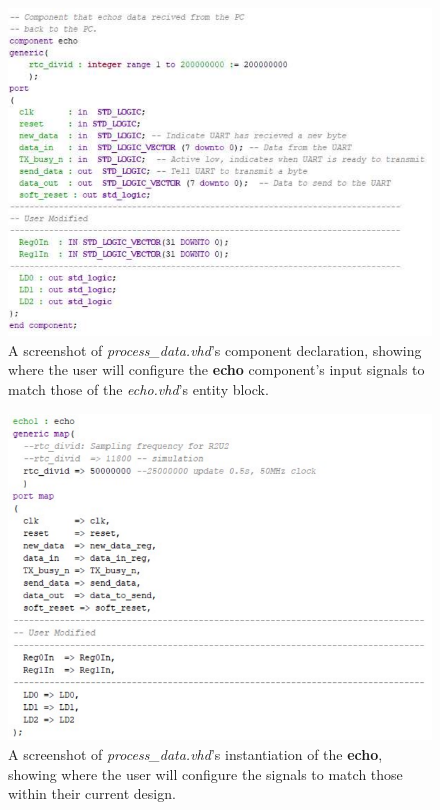 \begin{figure}[H]
	\begin{center}
	\includegraphics[scale=0.5]{fig/r2u2_hw_process_component.pdf}
	\caption{A screenshot of \textit{process\_data.vhd}'s component declaration, showing where the user will configure the \textbf{echo} component's input signals to match those of the \textit{echo.vhd}'s entity block.
	\label{fig:r2u2hwProCom}} 
	\end{center}
\end{figure}

\begin{figure}[H]
	\begin{center}
	\includegraphics[scale=0.5]{fig/r2u2_hw_process_inst.pdf}
	\caption{A screenshot of \textit{process\_data.vhd}'s instantiation of the \textbf{echo}, showing where the user will configure the signals to match those within their current design.
	\label{fig:r2u2hwProInst}} 
	\end{center}
\end{figure}

